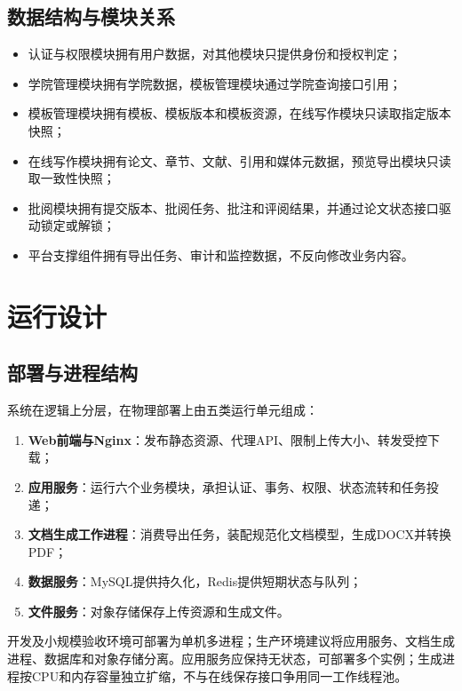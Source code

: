 \documentclass{../template/softeng}
\begin{document}
	\subsection{数据结构与模块关系}
	\begin{itemize}
		\item 认证与权限模块拥有用户数据，对其他模块只提供身份和授权判定；
		\item 学院管理模块拥有学院数据，模板管理模块通过学院查询接口引用；
		\item 模板管理模块拥有模板、模板版本和模板资源，在线写作模块只读取指定版本快照；
		\item 在线写作模块拥有论文、章节、文献、引用和媒体元数据，预览导出模块只读取一致性快照；
		\item 批阅模块拥有提交版本、批阅任务、批注和评阅结果，并通过论文状态接口驱动锁定或解锁；
		\item 平台支撑组件拥有导出任务、审计和监控数据，不反向修改业务内容。
	\end{itemize}
	
	\section{运行设计}
	
	\subsection{部署与进程结构}
	系统在逻辑上分层，在物理部署上由五类运行单元组成：
	\begin{enumerate}
		\item \textbf{Web前端与Nginx}：发布静态资源、代理API、限制上传大小、转发受控下载；
		\item \textbf{应用服务}：运行六个业务模块，承担认证、事务、权限、状态流转和任务投递；
		\item \textbf{文档生成工作进程}：消费导出任务，装配规范化文档模型，生成DOCX并转换PDF；
		\item \textbf{数据服务}：MySQL提供持久化，Redis提供短期状态与队列；
		\item \textbf{文件服务}：对象存储保存上传资源和生成文件。
	\end{enumerate}
	
	开发及小规模验收环境可部署为单机多进程；生产环境建议将应用服务、文档生成进程、数据库和对象存储分离。应用服务应保持无状态，可部署多个实例；生成进程按CPU和内存容量独立扩缩，不与在线保存接口争用同一工作线程池。
	
\end{document}
